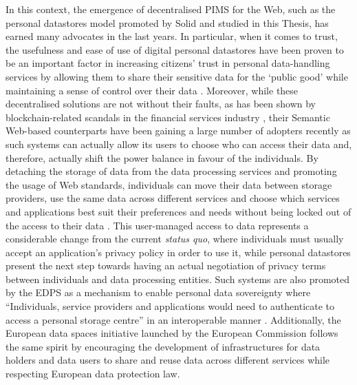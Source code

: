 In this context, the emergence of decentralised PIMS for the Web, such as the personal datastores model promoted by Solid and studied in this Thesis, has earned many advocates in the last years.
In particular, when it comes to trust, the usefulness and ease of use of digital personal datastores have been proven to be an important factor in increasing citizens' trust in personal data-handling services by allowing them to share their sensitive data for the `public good' while maintaining a sense of control over their data \citep{mariani_explaining_2021}.
Moreover, while these decentralised solutions are not without their faults, as has been shown by blockchain-related scandals in the financial services industry \citep{zetzsche_ico_2019}, their Semantic Web-based counterparts have been gaining a large number of adopters recently as such systems can actually allow its users to choose who can access their data and, therefore, actually shift the power balance in favour of the individuals.
By detaching the storage of data from the data processing services and promoting the usage of Web standards, individuals can move their data between storage providers, use the same data across different services and choose which services and applications best suit their preferences and needs without being locked out of the access to their data \citep{verbrugge_towards_2021,ilves_roadmap_2019}.
This user-managed access to data represents a considerable change from the current \textit{status quo}, where individuals must usually accept an application's privacy policy in order to use it, while personal datastores present the next step towards having an actual negotiation of privacy terms between individuals and data processing entities.
Such systems are also promoted by the EDPS as a mechanism to enable personal data sovereignty where ``Individuals, service providers and applications would need to authenticate to access a personal storage centre'' in an interoperable manner \citep{european_data_protection_supervisor_techdispatch_2021}.
Additionally, the European data spaces initiative launched by the European Commission \citep{european_commission_communication_2020} follows the same spirit by encouraging the development of infrastructures for data holders and data users to share and reuse data across different services while respecting European data protection law.


